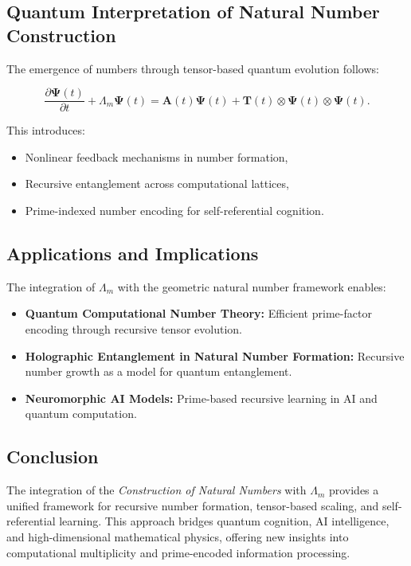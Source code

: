 \documentclass{article}
\theoremstyle{plain}
\begin{document}
\begin{itemize}
\begin{itemize}
\subsection{Quantum Interpretation of Natural Number Construction}

The emergence of numbers through tensor-based quantum evolution follows:

\begin{equation}
    \frac{\partial \bm{\Psi}(t)}{\partial t} + \Lambda_m \bm{\Psi}(t) = \bm{A}(t) \bm{\Psi}(t) + \bm{T}(t) \otimes \bm{\Psi}(t) \otimes \bm{\Psi}(t).
\end{equation}

This introduces:
\begin{itemize}
    \item Nonlinear feedback mechanisms in number formation,
    \item Recursive entanglement across computational lattices,
    \item Prime-indexed number encoding for self-referential cognition.
\end{itemize}

\subsection{Applications and Implications}

The integration of $\Lambda_m$ with the geometric natural number framework enables:
\begin{itemize}
    \item \textbf{Quantum Computational Number Theory:} Efficient prime-factor encoding through recursive tensor evolution.
    \item \textbf{Holographic Entanglement in Natural Number Formation:} Recursive number growth as a model for quantum entanglement.
    \item \textbf{Neuromorphic AI Models:} Prime-based recursive learning in AI and quantum computation.
\end{itemize}

\subsection{Conclusion}

The integration of the \textit{Construction of Natural Numbers} with $\Lambda_m$ provides a unified framework for recursive number formation, tensor-based scaling, and self-referential learning. This approach bridges quantum cognition, AI intelligence, and high-dimensional mathematical physics, offering new insights into computational multiplicity and prime-encoded information processing.

\end{itemize}
\end{itemize}
\end{document}
